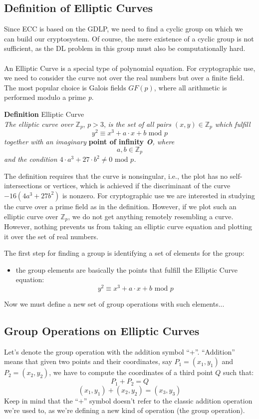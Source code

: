 \documentclass[11pt, a4paper]{article}
\newcommand{\doublequotes}[1]{“#1”}
\newcommand{\mymod}{
    \text{ mod }
}
\begin{document}
\subsection{Definition of Elliptic Curves}
Since ECC is based on the GDLP, we need to find a cyclic group on which we can build our cryptosystem. Of course, the mere existence of a cyclic group is not sufficient, as the DL problem in this group must also be computationally hard.\\\\
An Elliptic Curve is a special type of polynomial equation. For cryptographic use, we need to consider the curve not over the real numbers but over a finite field. The most popular choice is Galois fields $GF(p)$, where all arithmetic is performed modulo a prime \textit{p}.
\begin{framed}
    \hfill\break\textbf{Definition} Elliptic Curve\\
    \textit{The elliptic curve over} $\mathbb{Z}_p$, $p>3$, \textit{is the set of all pairs $(x,y)\in\mathbb{Z}_p$ which fulfill}
    $$y^2\equiv x^3+a\cdot x+b\mymod p$$
    \textit{together with an imaginary} \textbf{point of infinity \textit{O}}\textit{, where}
    $$a,b\in\mathbb{Z}_p$$
    \textit{and the condition $4\cdot a^3+27\cdot b^2\not=0\mymod p$.}
\end{framed}
The definition requires that the curve is nonsingular, i.e., the plot has no self-intersections or vertices, which is achieved if the discriminant of the curve $-16(4a^3+27b^2)$ is nonzero. For cryptographic use we are interested in studying the curve over a prime field as in the definition. However, if we plot such an elliptic curve over $\mathbb{Z}_p$, we do not get anything remotely resembling a curve. However, nothing prevents us from taking an elliptic curve equation and plotting it over the set of real numbers.

\newpage
\hfill\break
The first step for finding a group is identifying a set of elements for the group:
\begin{itemize}
    \item the group elements are basically the points that fulfill the Elliptic Curve equation:$$y^2\equiv x^3+a\cdot x+b\mymod p$$
\end{itemize}
Now we must define a new set of group operations with such elements...

\subsection{Group Operations on Elliptic Curves}
Let's denote the group operation with the addition symbol \doublequotes{+}. \doublequotes{Addition} means that given two points and their coordinates, say $P_1=(x_1,y_1)$ and $P_2=(x_2,y_2)$, we have to compute the coordinates of a third point $Q$ such that:
$$P_1+P_2=Q$$
$$(x_1,y_1)+(x_2,y_2)=(x_3,y_3)$$
Keep in mind that the \doublequotes{+} symbol doesn't refer to the classic addition operation we're used to, as we're defining a new kind of operation (the group operation).
\end{document}
